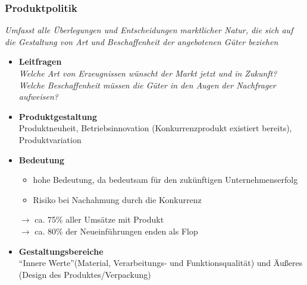 \documentclass[a4paper,11pt, twoside]{article}
\begin{document}
\subsubsection*{Produktpolitik}
\textit{Umfasst alle Überlegungen und Entscheidungen marktlicher Natur, die sich auf die Gestaltung von Art und Beschaffenheit der angebotenen Güter beziehen}
\begin{itemize}

	\item \textbf{Leitfragen}\\
\textit{Welche Art von Erzeugnissen wünscht der Markt jetzt und in Zukunft?}\\
\textit{Welche Beschaffenheit müssen die Güter in den Augen der Nachfrager aufweisen?}

	\item \textbf{Produktgestaltung}\\
Produktneuheit, Betriebsinnovation (Konkurrenzprodukt existiert bereits), Produktvariation

	\item \textbf{Bedeutung}\\
\begin{itemize}
	\item hohe Bedeutung, da bedeutsam für den zukünftigen Unternehmenserfolg
	\item Risiko bei Nachahmung durch die Konkurrenz
\end{itemize}
$\rightarrow$ ca. 75\% aller Umsätze mit Produkt\\
$\rightarrow$ ca. 80\% der Neueinführungen enden als Flop

	\item \textbf{Gestaltungsbereiche}\\
"`Innere Werte"'(Material, Verarbeitungs- und Funktionsqualität) und Äußeres (Design des Produktes/Verpackung)


\end{itemize}
\end{document}
